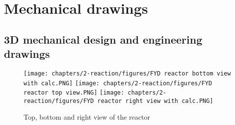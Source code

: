 \section{Mechanical drawings}
\label{app:reactor-drawings}
\subsection{3D mechanical design and engineering drawings}
\label{app:engineeringdesign}

\begin{figure}[H]
    \centering
    \texttt{[image: chapters/2-reaction/figures/FYD reactor bottom view with calc.PNG]}
    \texttt{[image: chapters/2-reaction/figures/FYD reactor top view.PNG]}
    \texttt{[image: chapters/2-reaction/figures/FYD reactor right view with calc.PNG]}
    \caption{Top, bottom and right view of the reactor}
    \label{fig:reactortopbottomrightview}
\end{figure}